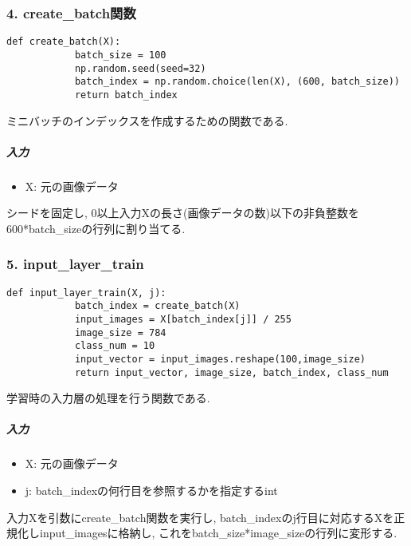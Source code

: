 \documentclass[a4j, titlepage]{jarticle}
\begin{document}
    \subsubsection*{4. create\_batch関数}
        \begin{lstlisting}[caption=ミニバッチを作成,label=fuga]
        def create_batch(X):
            batch_size = 100
            np.random.seed(seed=32)
            batch_index = np.random.choice(len(X), (600, batch_size))
            return batch_index
        \end{lstlisting}
        ミニバッチのインデックスを作成するための関数である.
            \subparagraph*{入力}
            \begin{itemize}
                \item X: 元の画像データ
            \end{itemize}
            シードを固定し, 0以上入力Xの長さ(画像データの数)以下の非負整数を600*batch\_sizeの行列に割り当てる.

    \subsubsection*{5. input\_layer\_train}
        \begin{lstlisting}[caption=学習時の入力層の処理,label=fuga]
        def input_layer_train(X, j):
            batch_index = create_batch(X)
            input_images = X[batch_index[j]] / 255
            image_size = 784
            class_num = 10
            input_vector = input_images.reshape(100,image_size)
            return input_vector, image_size, batch_index, class_num
        \end{lstlisting}
        学習時の入力層の処理を行う関数である.
            \subparagraph*{入力}
            \begin{itemize}
                \item X: 元の画像データ
                \item j: batch\_indexの何行目を参照するかを指定するint
            \end{itemize}
            入力Xを引数にcreate\_batch関数を実行し, batch\_indexのj行目に対応するXを正規化しinput\_imagesに格納し, これをbatch\_size*image\_sizeの行列に変形する.
\end{document}
